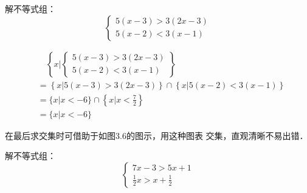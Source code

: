 \begin{example}
    解不等式组：
    \[\begin{cases}
        5(x-3)>3(2x-3)\\
        5(x-2)<3(x-1)
    \end{cases}\]
\end{example}

\begin{solution}
\[\begin{split}
&\quad \left\{x\Big|\begin{cases}
    5(x-3)>3(2x-3)\\
    5(x-2)<3(x-1)
\end{cases} \right\}\\
&=\left\{x\Big|5(x-3)>3(2x-3) \right\} \cap \left\{x\Big|5(x-2)<3(x-1) \right\}    \\
&=\{x|x<-6\}\cap\left\{x\Big|x<\frac{7}{2}\right\}\\
&=\{x|x<-6\}
\end{split}\] 

\begin{figure}[htp]
    \centering
{}
    \caption{}
\end{figure}


在最后求交集时可借助于如图3.6的图示，用这种图表
交集，直观清晰不易出错．
\end{solution}

\begin{example}
    解不等式组：
\[\begin{cases}
    7x-3>5x+1\\
    \frac{1}{2}x>x+\frac{1}{2}
\end{cases}\]
\end{example}

